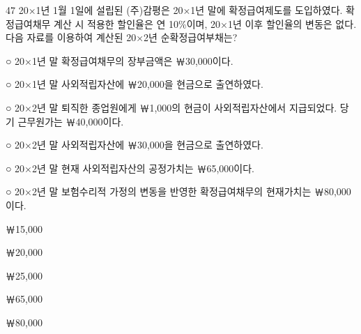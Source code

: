 \begin{question}{47}
20×1년 1월 1일에 설립된 (주)감평은 20×1년 말에 확정급여제도를 도입하였다. 확정급여채무 계산 시 적용한 할인율은 연 10\%이며, 20×1년 이후 할인율의 변동은 없다. 다음 자료를 이용하여 계산된 20×2년 순확정급여부채는?
\begin{framedtext}
○ 20×1년 말 확정급여채무의 장부금액은 ￦30,000이다. \par
○ 20×1년 말 사외적립자산에 ￦20,000을 현금으로 출연하였다. \par
○ 20×2년 말 퇴직한 종업원에게 ￦1,000의 현금이 사외적립자산에서 지급되었다. 당기 근무원가는 ￦40,000이다. \par
○ 20×2년 말 사외적립자산에 ￦30,000을 현금으로 출연하였다. \par
○ 20×2년 말 현재 사외적립자산의 공정가치는 ￦65,000이다. \par
○ 20×2년 말 보험수리적 가정의 변동을 반영한 확정급여채무의 현재가치는 ￦80,000이다.
\end{framedtext}
\begin{choices}
  \item ￦15,000
  \item ￦20,000
  \item ￦25,000
  \item ￦65,000
  \item ￦80,000
\end{choices}
\end{question}
